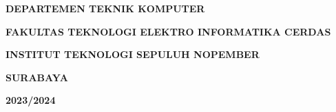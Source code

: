 \begin{titlepage}
\begin{center}
        \vspace{0.5cm}
        \textbf{ DEPARTEMEN TEKNIK KOMPUTER}
       
     \vspace{0.3cm}
       \textbf{FAKULTAS TEKNOLOGI ELEKTRO INFORMATIKA CERDAS}

        \vspace{0.3cm}
       \textbf{INSTITUT TEKNOLOGI SEPULUH NOPEMBER}
       
       \vspace{0.3cm}
       \textbf{SURABAYA}
       
       \vspace{0.3cm}
       \textbf{2023/2024}
       
   \end{center}
\end{titlepage}
